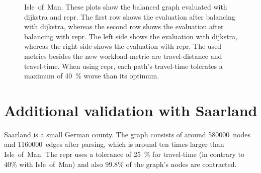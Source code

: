         \begin{figure}[hbp]
            \centering%
            \hfill%

            \hfill%
            \caption[Workloads on the balanced graph of Isle~of~Man]{%
                Isle~of~Man.
                These plots show the balanced graph evaluated with \gls{dijkstra} and \gls{repr}.
                The first row shows the evaluation after \gls{balancing} with \gls{dijkstra}, whereas the second row shows the evaluation after \gls{balancing} with \gls{repr}.
                The left side shows the evaluation with \gls{dijkstra}, whereas the right side shows the evaluation with \gls{repr}.
                The used \glspl{metric} besides the new workload-\gls{metric} are travel-distance and travel-time.
                When using \gls{repr}, each path's travel-time tolerates a maximum of \si{\num{40} \percent} worse than its optimum.
                \label{fig:isle_of_man/both/both/1/workloads}
            }
        \end{figure}

    \section{Additional validation with Saarland}

        Saarland is a small German county.
        The graph consists of around \num{580000}~nodes and \num{1160000}~edges after parsing, which is around ten times larger than Isle~of~Man.
        The \gls{repr} uses a tolerance of \si{25 \percent} for travel-time (in contrary to $\si{40 \percent}$ with Isle~of~Man) and also $\si{\num{99.8} \percent}$ of the graph's nodes are contracted.

